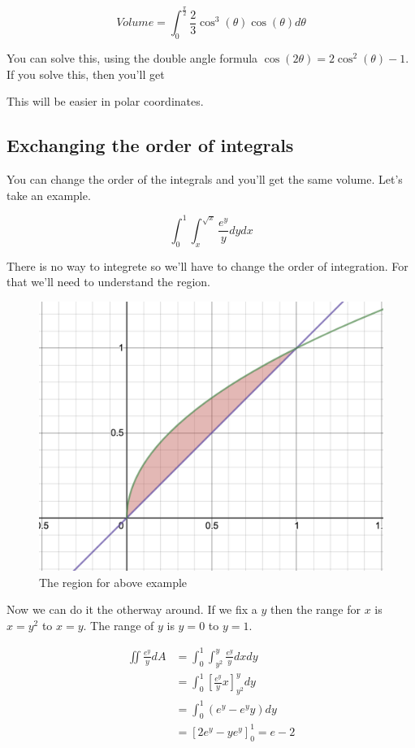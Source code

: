 $$
Volume = \int_0^{\frac{\pi}{2}} \frac{2}{3} \cos^3(\theta) \cos(\theta) d\theta
$$

You can solve this, using the double angle formula $\cos(2\theta) = 2\cos^2(\theta) - 1$.
If you solve this, then you'll get 

This will be easier in polar coordinates.


\subsection*{Exchanging the order of integrals}

You can change the order of the integrals and you'll get the same volume.
Let's take an example.

$$ \int_0^1 \int_x^{\sqrt{x}} \frac{e^y}{y} dy  dx $$

There is no way to integrete  so we'll have to change the order of integration.
For that we'll need to understand the region.

\begin{figure}[ht!]
    \centering
    \includegraphics[scale=0.5]{./images/lecture_11_figure_3.png}
    \caption{The region for above example}
\end{figure}

Now we can do it the otherway around. 
If we fix a $y$ then the range for $x$ is $x = y^2$ to $x = y$.
The range of $y$ is $y = 0$ to $y = 1$.

\begin{align*}
\iint \frac{e^y}{y} dA  
        & = \int_0^1 \int_{y^2}^{y} \frac{e^y}{y} dx dy \\
        & = \int_0^1 \left[ \frac{e^y}{y} x \right]_{y^2}^y dy \\
        & = \int_0^1 \left( e^y - e^y y \right) dy \\
        & = \left[ 2e^y - ye^y \right]_0^1 = e - 2
\end{align*}